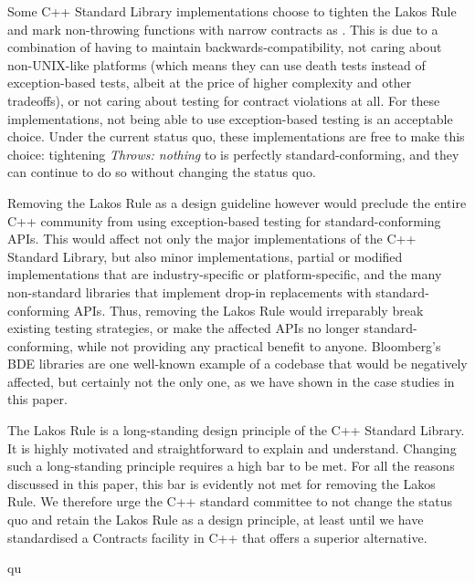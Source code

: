 Some C++ Standard Library implementations choose to tighten the Lakos Rule and mark non-throwing functions with narrow contracts as . This is due to a combination of having to maintain backwards-compatibility, not caring about non-UNIX-like platforms (which means they can use death tests instead of exception-based tests, albeit at the price of higher complexity and other tradeoffs), or not caring about testing for contract violations at all. For these implementations, not being able to use exception-based testing is an acceptable choice. Under the current status quo, these implementations are free to make this choice: tightening \emph{Throws: nothing} to  is perfectly standard-conforming, and they can continue to do so without changing the status quo.

Removing the Lakos Rule as a design guideline however would preclude the entire C++ community from using exception-based testing for standard-conforming APIs. This would affect not only the major implementations of the C++ Standard Library, but also minor implementations, partial or modified implementations that are industry-specific or platform-specific, and the many non-standard libraries that implement drop-in replacements with standard-conforming APIs. Thus, removing the Lakos Rule would irreparably break existing testing strategies, or make the affected APIs no longer standard-conforming, while not providing any practical benefit to anyone. Bloomberg's BDE libraries are one well-known example of a codebase that would be negatively affected, but certainly not the only one, as we have shown in the case studies in this paper. 

The Lakos Rule is a long-standing design principle of the C++ Standard Library. It is highly motivated and straightforward to explain and understand. Changing such a long-standing principle requires a high bar to be met. For all the reasons discussed in this paper, this bar is evidently not met for removing the Lakos Rule. We therefore urge the C++ standard committee to not change the status quo and retain the Lakos Rule as a design principle, at least until we have standardised a Contracts facility in C++ that offers a superior alternative.





\renewcommand{\bibname}{References}



qu